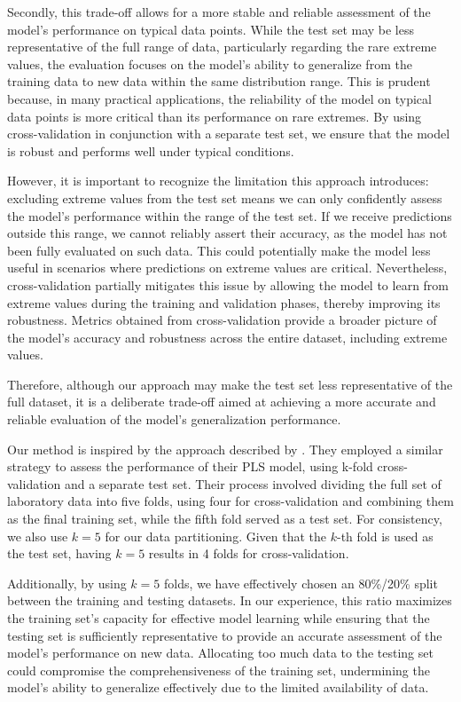Secondly, this trade-off allows for a more stable and reliable assessment of the model's performance on typical data points.
While the test set may be less representative of the full range of data, particularly regarding the rare extreme values, the evaluation focuses on the model's ability to generalize from the training data to new data within the same distribution range.
This is prudent because, in many practical applications, the reliability of the model on typical data points is more critical than its performance on rare extremes.
By using cross-validation in conjunction with a separate test set, we ensure that the model is robust and performs well under typical conditions.

However, it is important to recognize the limitation this approach introduces: excluding extreme values from the test set means we can only confidently assess the model's performance within the range of the test set.
If we receive predictions outside this range, we cannot reliably assert their accuracy, as the model has not been fully evaluated on such data.
This could potentially make the model less useful in scenarios where predictions on extreme values are critical.
Nevertheless, cross-validation partially mitigates this issue by allowing the model to learn from extreme values during the training and validation phases, thereby improving its robustness.
Metrics obtained from cross-validation provide a broader picture of the model's accuracy and robustness across the entire dataset, including extreme values.

Therefore, although our approach may make the test set less representative of the full dataset, it is a deliberate trade-off aimed at achieving a more accurate and reliable evaluation of the model's generalization performance.

Our method is inspired by the approach described by \citet{andersonImprovedAccuracyQuantitative2017}.
They employed a similar strategy to assess the performance of their PLS model, using k-fold cross-validation and a separate test set.
Their process involved dividing the full set of laboratory data into five folds, using four for cross-validation and combining them as the final training set, while the fifth fold served as a test set.
For consistency, we also use $k = 5$ for our data partitioning.
Given that the $k$-th fold is used as the test set, having $k=5$ results in 4 folds for cross-validation.

Additionally, by using $k = 5$ folds, we have effectively chosen an 80\%/20\% split between the training and testing datasets.
In our experience, this ratio maximizes the training set's capacity for effective model learning while ensuring that the testing set is sufficiently representative to provide an accurate assessment of the model's performance on new data.
Allocating too much data to the testing set could compromise the comprehensiveness of the training set, undermining the model's ability to generalize effectively due to the limited availability of data.

